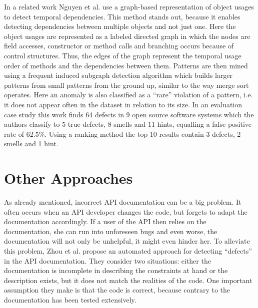 In a related work Nguyen et al. \cite{nguyen2009graph} use a graph-based representation of object usages to detect temporal dependencies.
This method stands out, because it enables detecting dependencies between multiple objects and not just one.
Here the object usages are represented as a labeled directed graph in which the nodes are field accesses, constructor or method calls and branching occurs because of control structures.
Thus, the edges of the graph represent the temporal usage order of methods and the dependencies between them.
Patterns are then mined using a frequent induced subgraph detection algorithm which builds larger patterns from small patterns from the ground up, similar to the way merge sort operates.
Here an anomaly is also classified as a ``rare'' violation of a pattern, i.e. it does not appear often in the dataset in relation to its size.
In an evaluation case study this work finds 64 defects in 9 open source software systems which the authors classify to 5 true defects, 8 smells and 11 hints, equalling a false positive rate of 62.5\%.
Using a ranking method the top 10 results contain 3 defects, 2 smells and 1 hint.


\section{Other Approaches}

As already mentioned, incorrect API documentation can be a big problem.
It often occurs when an API developer changes the code, but forgets to adapt the documentation accordingly.
If a user of the API then relies on the documentation, she can run into unforeseen bugs and even worse, the documentation will not only be unhelpful, it might even hinder her.
To alleviate this problem, Zhou et al.  \cite{zhou2017analyzing} propose an automated approach for detecting ``defects'' in the API documentation.
They consider two situations: either the documentation is incomplete in describing the constraints at hand or the description exists, but it does not match the realities of the code.
One important assumption they make is that the code is correct, because contrary to the documentation has been tested extensively.


